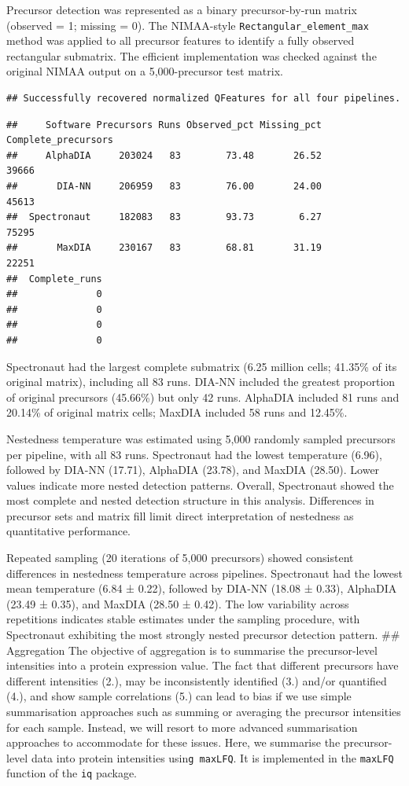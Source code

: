 \documentclass[
  10pt,
]{article}
\begin{document}
Precursor detection was represented as a binary precursor-by-run matrix
(observed = 1; missing = 0). The NIMAA-style
\texttt{Rectangular\_element\_max} method was applied to all precursor
features to identify a fully observed rectangular submatrix. The
efficient implementation was checked against the original NIMAA output
on a 5,000-precursor test matrix.

\begin{verbatim}
## Successfully recovered normalized QFeatures for all four pipelines.
\end{verbatim}

\begin{verbatim}
##     Software Precursors Runs Observed_pct Missing_pct Complete_precursors
##     AlphaDIA     203024   83        73.48       26.52               39666
##       DIA-NN     206959   83        76.00       24.00               45613
##  Spectronaut     182083   83        93.73        6.27               75295
##       MaxDIA     230167   83        68.81       31.19               22251
##  Complete_runs
##              0
##              0
##              0
##              0
\end{verbatim}

Spectronaut had the largest complete submatrix (6.25 million cells;
41.35\% of its original matrix), including all 83 runs. DIA-NN included
the greatest proportion of original precursors (45.66\%) but only 42
runs. AlphaDIA included 81 runs and 20.14\% of original matrix cells;
MaxDIA included 58 runs and 12.45\%.

Nestedness temperature was estimated using 5,000 randomly sampled
precursors per pipeline, with all 83 runs. Spectronaut had the lowest
temperature (6.96), followed by DIA-NN (17.71), AlphaDIA (23.78), and
MaxDIA (28.50). Lower values indicate more nested detection patterns.
Overall, Spectronaut showed the most complete and nested detection
structure in this analysis. Differences in precursor sets and matrix
fill limit direct interpretation of nestedness as quantitative
performance.

Repeated sampling (20 iterations of 5,000 precursors) showed consistent
differences in nestedness temperature across pipelines. Spectronaut had
the lowest mean temperature (6.84 ± 0.22), followed by DIA-NN (18.08 ±
0.33), AlphaDIA (23.49 ± 0.35), and MaxDIA (28.50 ± 0.42). The low
variability across repetitions indicates stable estimates under the
sampling procedure, with Spectronaut exhibiting the most strongly nested
precursor detection pattern. \#\# Aggregation The objective of
aggregation is to summarise the precursor-level intensities into a
protein expression value. The fact that different precursors have
different intensities (2.), may be inconsistently identified (3.) and/or
quantified (4.), and show sample correlations (5.) can lead to bias if
we use simple summarisation approaches such as summing or averaging the
precursor intensities for each sample. Instead, we will resort to more
advanced summarisation approaches to accommodate for these issues. Here,
we summarise the precursor-level data into protein intensities
usin\texttt{g\ maxLFQ}. It is implemented in the \texttt{maxLFQ}
function of the \texttt{iq} package.
\end{document}
